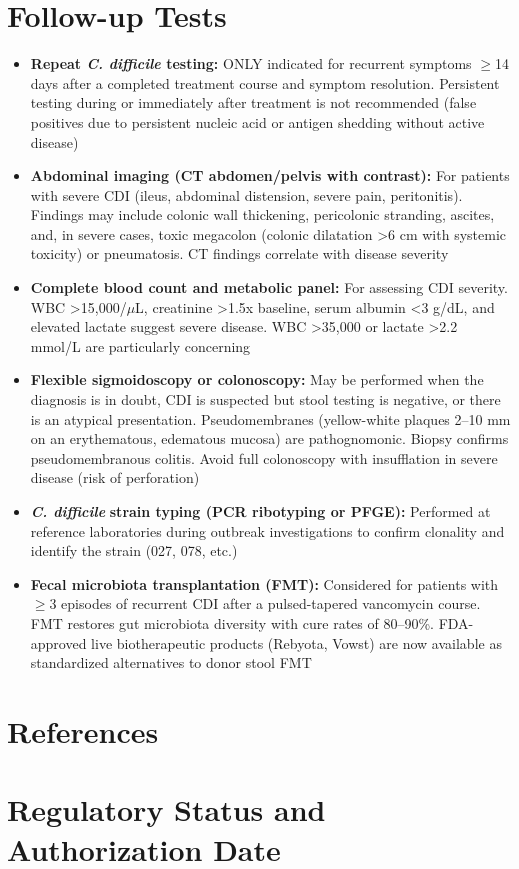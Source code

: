 \section*{Follow-up Tests}
\begin{itemize}
  \item \textbf{Repeat \textit{C. difficile} testing:} ONLY indicated for recurrent symptoms $\geq$14 days after a completed treatment course and symptom resolution. Persistent testing during or immediately after treatment is not recommended (false positives due to persistent nucleic acid or antigen shedding without active disease)
  \item \textbf{Abdominal imaging (CT abdomen/pelvis with contrast):} For patients with severe CDI (ileus, abdominal distension, severe pain, peritonitis). Findings may include colonic wall thickening, pericolonic stranding, ascites, and, in severe cases, toxic megacolon (colonic dilatation >6 cm with systemic toxicity) or pneumatosis. CT findings correlate with disease severity
  \item \textbf{Complete blood count and metabolic panel:} For assessing CDI severity. WBC >15,000/$\mu$L, creatinine >1.5x baseline, serum albumin <3 g/dL, and elevated lactate suggest severe disease. WBC >35,000 or lactate >2.2 mmol/L are particularly concerning
  \item \textbf{Flexible sigmoidoscopy or colonoscopy:} May be performed when the diagnosis is in doubt, CDI is suspected but stool testing is negative, or there is an atypical presentation. Pseudomembranes (yellow-white plaques 2--10 mm on an erythematous, edematous mucosa) are pathognomonic. Biopsy confirms pseudomembranous colitis. Avoid full colonoscopy with insufflation in severe disease (risk of perforation)
  \item \textit{\textbf{C. difficile}} \textbf{strain typing (PCR ribotyping or PFGE):} Performed at reference laboratories during outbreak investigations to confirm clonality and identify the strain (027, 078, etc.)
  \item \textbf{Fecal microbiota transplantation (FMT):} Considered for patients with $\geq$3 episodes of recurrent CDI after a pulsed-tapered vancomycin course. FMT restores gut microbiota diversity with cure rates of 80--90\%. FDA-approved live biotherapeutic products (Rebyota, Vowst) are now available as standardized alternatives to donor stool FMT
\end{itemize}

\section*{References}



\clearpage
\section*{Regulatory Status and Authorization Date}

\clearpage
